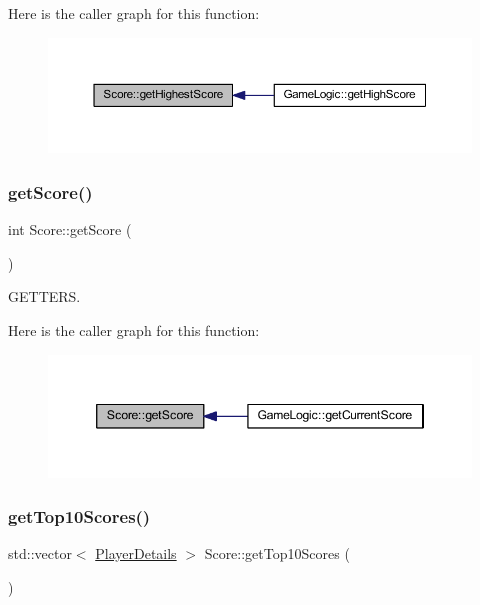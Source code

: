 Here is the caller graph for this function\+:\nopagebreak
\begin{figure}[H]
\begin{center}
\leavevmode
\includegraphics[width=350pt]{class_score_afb50f4e2cb31006d23d3281dd1703880_icgraph}
\end{center}
\end{figure}
\mbox{\label{class_score_a8627c93270c188a3fd28a25b1d07a9e7}} 
\subsubsection{\texorpdfstring{get\+Score()}{getScore()}}
{\footnotesize\ttfamily int Score\+::get\+Score (\begin{DoxyParamCaption}{ }\end{DoxyParamCaption})}



G\+E\+T\+T\+E\+RS. 

Here is the caller graph for this function\+:\nopagebreak
\begin{figure}[H]
\begin{center}
\leavevmode
\includegraphics[width=346pt]{class_score_a8627c93270c188a3fd28a25b1d07a9e7_icgraph}
\end{center}
\end{figure}
\mbox{\label{class_score_a13094831f08b313321193e212862417b}} 
\subsubsection{\texorpdfstring{get\+Top10\+Scores()}{getTop10Scores()}}
{\footnotesize\ttfamily std\+::vector$<$ \hyperlink{struct_player_details}{Player\+Details} $>$ Score\+::get\+Top10\+Scores (\begin{DoxyParamCaption}{ }\end{DoxyParamCaption})}

